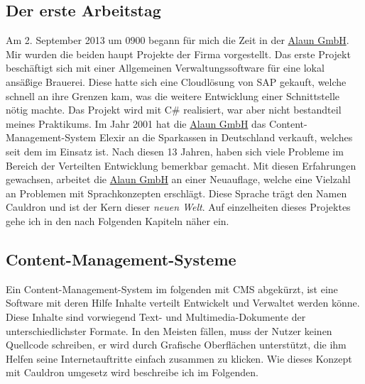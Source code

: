 \documentclass{scrartcl}
\begin{document}
\subsection{Der erste Arbeitstag}

Am 2. September 2013 um 0900 begann für mich die Zeit in der \href{https://alaun.de/home/}{Alaun GmbH}.
Mir wurden die beiden haupt Projekte der Firma vorgestellt. Das erste Projekt beschäftigt sich mit einer Allgemeinen
Verwaltungssoftware für eine lokal ansäßige Brauerei. Diese hatte sich eine Cloudlösung von SAP gekauft, welche
schnell an ihre Grenzen kam, was die weitere Entwicklung einer Schnittstelle nötig machte. Das Projekt wird mit C\#
realisiert, war aber nicht bestandteil meines Praktikums.
Im Jahr 2001 hat die \href{https://alaun.de/home/}{Alaun GmbH} das Content-Management-System Elexir an die Sparkassen
in Deutschland verkauft, welches seit dem im Einsatz ist. Nach diesen 13 Jahren, haben sich viele Probleme im Bereich
der Verteilten Entwicklung bemerkbar gemacht.
Mit diesen Erfahrungen gewachsen, arbeitet die \href{https://alaun.de/home/}{Alaun GmbH} an einer Neuauflage, welche
eine Vielzahl an Problemen mit Sprachkonzepten erschlägt. Diese Sprache trägt den Namen Cauldron und ist der Kern
dieser \textit{neuen Welt}.
Auf einzelheiten dieses Projektes gehe ich in den nach Folgenden Kapiteln näher ein. 

\subsection{Content-Management-Systeme}

Ein Content-Management-System im folgenden mit CMS abgekürzt, ist eine Software mit deren Hilfe Inhalte verteilt Entwickelt
und Verwaltet werden könne. Diese Inhalte sind vorwiegend Text- und Multimedia-Dokumente der unterschiedlichster Formate.
In den Meisten fällen, muss der Nutzer keinen Quellcode schreiben, er wird durch Grafische Oberflächen unterstützt, die
ihm Helfen seine Internetauftritte einfach zusammen zu klicken.
Wie dieses Konzept mit Cauldron umgesetz wird beschreibe ich im Folgenden.

 
\end{document}
